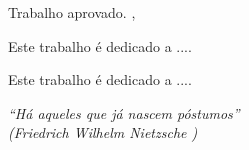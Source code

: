 \documentclass[12pt]{abntex2}
\renewcommand{\imprimircapa}{%
\begin{capa}%
\center
\imprimirinstituicao
\vspace*{1cm}

\par
\imprimirautor
\vfill

\begin{center}
\bfseries\imprimirtitulo
\end{center}
\vfill
\textsc{\imprimirlocal}
\large
\par   

\imprimirdata
\vspace*{1cm}
\end{capa}
}
\begin{document}
\imprimircapa

\imprimirfolhaderosto

\begin{folhadeaprovacao}
\begin{center}

\imprimirautor
\par
\vspace*{1cm}
{\bfseries\imprimirtitulo}
\par
\vspace*{1cm}
\end{center}

\hspace{.45\textwidth} \begin{minipage}{.5\textwidth}
\imprimirpreambulo
\end{minipage}

Trabalho aprovado. \imprimirlocal, \imprimirdata

\begin{center}
\vspace*{0.5cm}
{\large\imprimirlocal}
\par {\large\imprimirdata}
\vspace*{1cm}
\end{center}



\end{folhadeaprovacao}

\begin{dedicatoria}
\vspace*{\fill}
Este trabalho é dedicado a ....
\vspace*{\fill}
\end{dedicatoria}

\begin{agradecimentos}

Este trabalho é dedicado a ....

\end{agradecimentos}


\begin{epigrafe}

\vspace*{\fill}
\begin{flushright}
\textit{``Há aqueles que já nascem póstumos''\\ (Friedrich Wilhelm Nietzsche )}
\end{flushright}

\end{epigrafe}
\end{document}
